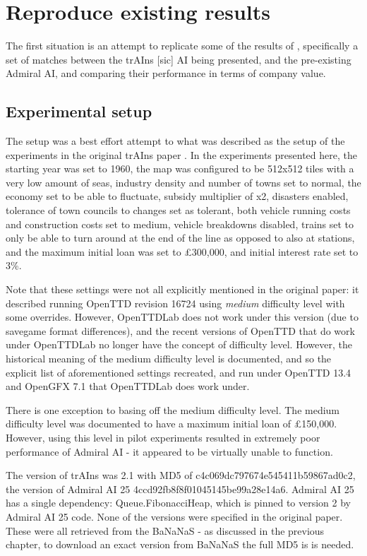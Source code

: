 \documentclass[logo,msc,dsti]{infthesis}    %
\begin{document}
\section{Reproduce existing results}

The first situation is an attempt to replicate some of the results of \cite{rios2009trains}, specifically a set of matches between the trAIns [sic] AI being presented, and the pre-existing Admiral AI, and comparing their performance in terms of company value.

\subsection{Experimental setup}

The setup was a best effort attempt to what was described as the setup of the experiments in the original trAIns paper \cite{rios2009trains}. In the experiments presented here, the starting year was set to 1960, the map was configured to be 512x512 tiles with a very low amount of seas, industry density and number of towns set to normal, the economy set to be able to fluctuate, subsidy multiplier of x2, disasters enabled, tolerance of town councils to changes set as tolerant, both vehicle running costs and construction costs set to medium, vehicle breakdowns disabled, trains set to only be able to turn around at the end of the line as opposed to also at stations, and the maximum initial loan was set to £300,000, and initial interest rate set to 3\%.

Note that these settings were not all explicitly mentioned in the original paper: it described running OpenTTD revision 16724 using \emph{medium} difficulty level with some overrides. However, OpenTTDLab does not work under this version (due to savegame format differences), and the recent versions of OpenTTD that do work under OpenTTDLab no longer have the concept of difficulty level. However, the historical meaning of the medium difficulty level is documented, and so the explicit list of aforementioned settings recreated, and run under OpenTTD 13.4 and OpenGFX 7.1 that OpenTTDLab does work under.

There is one exception to basing off the medium difficulty level. The medium difficulty level was documented to have a maximum initial loan of £150,000. However, using this level in pilot experiments resulted in extremely poor performance of Admiral AI - it appeared to be virtually unable to function.

The version of trAIns was 2.1 with MD5 of c4c069dc797674e545411b59867ad0c2,  the version of Admiral AI 25 4ccd92fb8f8f01045145be99a28e14a6. Admiral AI 25 has a single dependency: Queue.FibonacciHeap, which is pinned to version 2 by Admiral AI 25 code. None of the versions were specified in the original paper. These were all retrieved from the BaNaNaS - as discussed in the previous chapter, to download an exact version from BaNaNaS the full MD5 is is needed.
\end{document}

